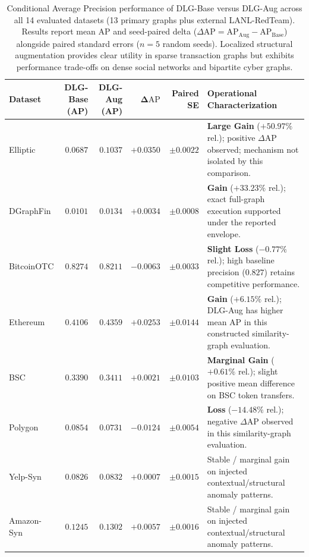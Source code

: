 \begin{table}[htbp]
\centering\footnotesize\setlength{\tabcolsep}{4.5pt}
\caption{Conditional Average Precision performance of DLG-Base versus DLG-Aug across all 14 evaluated datasets (13 primary graphs plus external LANL-RedTeam). Results report mean AP and seed-paired delta ($\Delta\mathrm{AP} = \mathrm{AP}_{\mathrm{Aug}} - \mathrm{AP}_{\mathrm{Base}}$) alongside paired standard errors ($n=5$ random seeds). Localized structural augmentation provides clear utility in sparse transaction graphs but exhibits performance trade-offs on dense social networks and bipartite cyber graphs.}
\label{tab:conditional_delta}
\begin{tabularx}{\textwidth}{lrrrr>{\raggedright\arraybackslash}X}\toprule
\textbf{Dataset} & \textbf{DLG-Base (AP)} & \textbf{DLG-Aug (AP)} & $\mathbf{\Delta\mathrm{AP}}$ & \textbf{Paired SE} & \textbf{Operational Characterization} \\\midrule
Elliptic & $0.0687$ & $0.1037$ & $\mathbf{+0.0350}$ & $\pm 0.0022$ & \textbf{Large Gain} ($+50.97\%$ rel.); positive $\Delta\mathrm{AP}$ observed; mechanism not isolated by this comparison. \\
DGraphFin & $0.0101$ & $0.0134$ & $+0.0034$ & $\pm 0.0008$ & \textbf{Gain} ($+33.23\%$ rel.); exact full-graph execution supported under the reported envelope. \\
BitcoinOTC & $0.8274$ & $0.8211$ & $-0.0063$ & $\pm 0.0033$ & \textbf{Slight Loss} ($-0.77\%$ rel.); high baseline precision ($0.827$) retains competitive performance. \\
Ethereum & $0.4106$ & $0.4359$ & $\mathbf{+0.0253}$ & $\pm 0.0144$ & \textbf{Gain} ($+6.15\%$ rel.); DLG-Aug has higher mean AP in this constructed similarity-graph evaluation. \\
BSC & $0.3390$ & $0.3411$ & $+0.0021$ & $\pm 0.0103$ & \textbf{Marginal Gain} ($+0.61\%$ rel.); slight positive mean difference on BSC token transfers. \\
Polygon & $0.0854$ & $0.0731$ & $-0.0124$ & $\pm 0.0054$ & \textbf{Loss} ($-14.48\%$ rel.); negative $\Delta\mathrm{AP}$ observed in this similarity-graph evaluation. \\
Yelp-Syn & $0.0826$ & $0.0832$ & $+0.0007$ & $\pm 0.0015$ & Stable / marginal gain on injected contextual/structural anomaly patterns. \\
Amazon-Syn & $0.1245$ & $0.1302$ & $+0.0057$ & $\pm 0.0016$ & Stable / marginal gain on injected contextual/structural anomaly patterns. \\

\end{tabularx}
\end{table}
